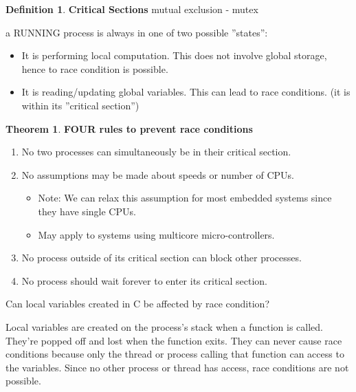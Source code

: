 \documentclass[11pt,a4paper]{article}
\theoremstyle{definition}
\newtheorem{theorem}{Theorem}[section]
\newtheorem{definition}{Definition}[section]
\newenvironment{myitemize}
{ \begin{itemize}
    \setlength{\itemsep}{5pt}
    \setlength{\parskip}{0pt}
    \setlength{\parsep}{0pt}     }
{ \end{itemize}                  }
\newenvironment{myenumerate}
{ \begin{enumerate}
    \setlength{\itemsep}{5pt}
    \setlength{\parskip}{0pt}
    \setlength{\parsep}{0pt}     }
{ \end{enumerate}                }
\begin{document}
\begin{definition}{\textbf{Critical Sections} mutual exclusion - \textsf{mutex}}
	
	a RUNNING process is always in one of two possible ''states'':
	\begin{myitemize}
		\item It is performing local computation. This does not involve global storage, hence to race condition is possible.
		\item It is reading/updating global variables. This can lead to race conditions. (it is within its ''critical section'')
	\end{myitemize}
\end{definition}

\begin{theorem}{\textbf{FOUR rules to prevent race conditions}}
	\begin{myenumerate}
		\item No two processes can simultaneously be in their critical section.
		\item No assumptions may be made about speeds or number of CPUs.
		\begin{myitemize}
			\item Note: We can relax this assumption for most embedded systems since they have single CPUs.
			\item May apply to systems using multicore micro-controllers.
		\end{myitemize}
		\item No process outside of its critical section can block other processes.
		\item No process should wait forever to enter its critical section.
	\end{myenumerate}
\end{theorem}

\begin{tcolorbox}
	\textsf{Can local variables created in C be affected by race condition?}
	
	Local variables are created on the process’s stack when a function is called. They’re popped off and lost when the function exits. They can never cause race conditions because only the thread or process calling that function can access to the variables.  Since no other process or thread has access, race conditions are not possible.
\end{tcolorbox}
\end{document}
